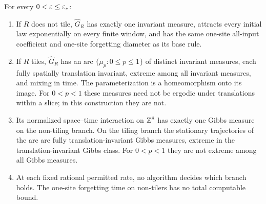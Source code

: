 \begin{corollary}\label{nw:stack}
For every $0<\varepsilon\le\varepsilon_*$:
\begin{enumerate}[label=\textup{(\roman*)}]
\item If $R$ does not tile, $\widehat G_R$ has exactly one invariant measure, attracts every initial law exponentially on every finite window, and has the same one-site all-input coefficient and one-site forgetting diameter as its base rule.
\item If $R$ tiles, $\widehat G_R$ has an arc $\{\mu_p:0\le p\le1\}$ of distinct invariant measures, each fully spatially translation invariant, extreme among all invariant measures, and mixing in time. The parameterization is a homeomorphism onto its image. For $0<p<1$ these measures need not be ergodic under translations within a slice; in this construction they are not.
\item Its normalized space--time interaction on $\mathbb{Z}^8$ has exactly one Gibbs measure on the non-tiling branch. On the tiling branch the stationary trajectories of the arc are fully translation-invariant Gibbs measures, extreme in the translation-invariant Gibbs class. For $0<p<1$ they are not extreme among all Gibbs measures.
\item At each fixed rational permitted rate, no algorithm decides which branch holds. The one-site forgetting time on non-tilers has no total computable bound.
\end{enumerate}
\end{corollary}
